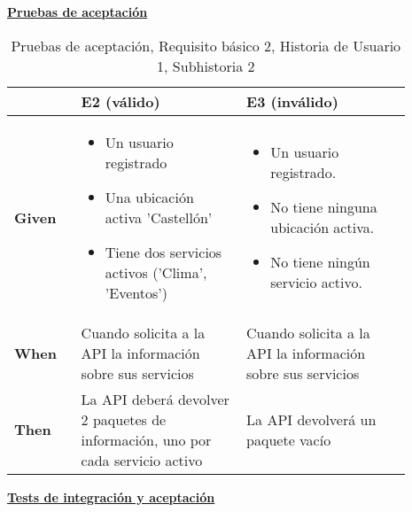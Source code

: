 \documentclass[../ei103948-project-documentation.tex]{subfiles}
\begin{document}
\begin{center}
							\textbf{\underline{Pruebas de aceptación}}
							\begin{table}[H]
								\centering
								\begin{tabular}{|p{0.15\linewidth}|p{0.37\linewidth}|p{0.37\linewidth}|}
									\hline
									\textbf{}      & \textbf{E2 (válido)}                                                                                   & \textbf{E3 (inválido)}                                                                      \\ \hline
									\textbf{Given} &
									\begin{itemize}\vspace{-5mm}\setlength\itemsep{0mm}\setlength\parskip{0mm}\setlength{\itemindent}{-5mm}
										\item Un usuario registrado
										\item Una ubicación activa 'Castellón'
										\item Tiene dos servicios activos ('Clima', 'Eventos')
									\end{itemize} & 
									\begin{itemize}\vspace{-5mm}\setlength\itemsep{0mm}\setlength\parskip{0mm}\setlength{\itemindent}{-5mm}
										\item Un usuario registrado.
										\item No tiene ninguna ubicación activa.
										\item No tiene ningún servicio activo.
									\end{itemize} \\ \hline
									\textbf{When}  & Cuando solicita a la API la información sobre sus servicios                                            & Cuando solicita a la API la información sobre sus servicios                                 \\ \hline
									\textbf{Then}  & La API deberá devolver 2 paquetes de información, uno por cada servicio activo                      & La API devolverá un paquete vacío                                                           \\ \hline
									\end{tabular}
								\caption{Pruebas de aceptación, Requisito básico 2, Historia de Usuario 1, Subhistoria 2}
							\end{table}
							\end{center}

							\newpage

							\begin{center}
								\textbf{\underline{Tests de integración y aceptación}}
							\end{center}
		
\end{document}

